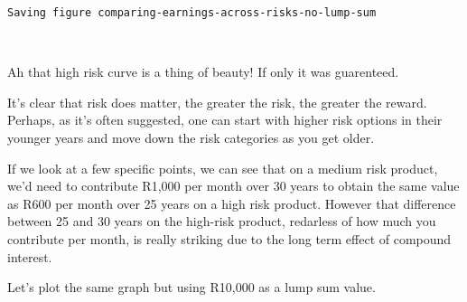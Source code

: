 \documentclass[11pt]{article}
\begin{document}
    \begin{Verbatim}[commandchars=\\\{\}]
Saving figure comparing-earnings-across-risks-no-lump-sum

    \end{Verbatim}

    \begin{center}
    \end{center}
    { \hspace*{\fill} \\}
    
    Ah that high risk curve is a thing of beauty! If only it was guarenteed.

It's clear that risk does matter, the greater the risk, the greater the
reward. Perhaps, as it's often suggested, one can start with higher risk
options in their younger years and move down the risk categories as you
get older.

If we look at a few specific points, we can see that on a medium risk
product, we'd need to contribute R1,000 per month over 30 years to
obtain the same value as R600 per month over 25 years on a high risk
product. However that difference between 25 and 30 years on the
high-risk product, redarless of how much you contribute per month, is
really striking due to the long term effect of compound interest.

Let's plot the same graph but using R10,000 as a lump sum value.
\end{document}
